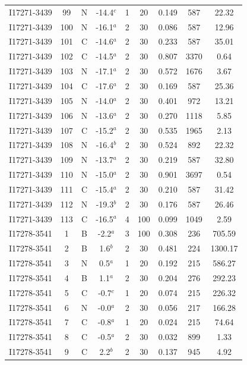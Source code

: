 \begin{table}
\begin{tabular}{ccccccccc}
I17271-3439 & 99 & N & -14.4$^{c}$ & 1 & 20 & 0.149 & 587 & 22.32 \\
I17271-3439 & 100 & N & -16.1$^{a}$ & 2 & 30 & 0.086 & 587 & 12.96 \\
I17271-3439 & 101 & C & -14.6$^{a}$ & 2 & 30 & 0.233 & 587 & 35.01 \\
I17271-3439 & 102 & C & -14.5$^{a}$ & 2 & 30 & 0.807 & 3370 & 0.64 \\
I17271-3439 & 103 & N & -17.1$^{a}$ & 2 & 30 & 0.572 & 1676 & 3.67 \\
I17271-3439 & 104 & C & -17.6$^{a}$ & 2 & 30 & 0.169 & 587 & 25.36 \\
I17271-3439 & 105 & N & -14.0$^{a}$ & 2 & 30 & 0.401 & 972 & 13.21 \\
I17271-3439 & 106 & N & -13.6$^{a}$ & 2 & 30 & 0.270 & 1118 & 5.85 \\
I17271-3439 & 107 & C & -15.2$^{a}$ & 2 & 30 & 0.535 & 1965 & 2.13 \\
I17271-3439 & 108 & N & -16.4$^{b}$ & 2 & 30 & 0.524 & 892 & 22.32 \\
I17271-3439 & 109 & N & -13.7$^{a}$ & 2 & 30 & 0.219 & 587 & 32.80 \\
I17271-3439 & 110 & N & -15.0$^{a}$ & 2 & 30 & 0.901 & 3697 & 0.54 \\
I17271-3439 & 111 & C & -15.4$^{a}$ & 2 & 30 & 0.210 & 587 & 31.42 \\
I17271-3439 & 112 & N & -19.3$^{b}$ & 2 & 30 & 0.176 & 587 & 26.46 \\
I17271-3439 & 113 & C & -16.5$^{a}$ & 4 & 100 & 0.099 & 1049 & 2.59 \\
I17278-3541 & 1 & B & -2.2$^{a}$ & 3 & 100 & 0.308 & 236 & 705.59 \\
I17278-3541 & 2 & B & 1.6$^{b}$ & 2 & 30 & 0.481 & 224 & 1300.17 \\
I17278-3541 & 3 & N & 0.5$^{a}$ & 1 & 20 & 0.192 & 215 & 586.27 \\
I17278-3541 & 4 & B & 1.1$^{a}$ & 2 & 30 & 0.204 & 276 & 292.23 \\
I17278-3541 & 5 & C & -0.7$^{c}$ & 1 & 20 & 0.074 & 215 & 226.32 \\
I17278-3541 & 6 & N & -0.0$^{a}$ & 2 & 30 & 0.056 & 217 & 166.28 \\
I17278-3541 & 7 & C & -0.8$^{a}$ & 1 & 20 & 0.024 & 215 & 74.64 \\
I17278-3541 & 8 & C & -0.5$^{a}$ & 2 & 30 & 0.032 & 899 & 1.33 \\
I17278-3541 & 9 & C & 2.2$^{b}$ & 2 & 30 & 0.137 & 945 & 4.92 \\

\end{tabular}
\end{table}
